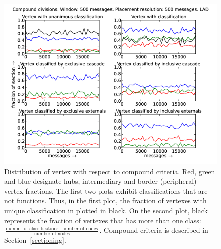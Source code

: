 \documentclass[%
 aip,
 jmp,%
 amsmath,amssymb,
 reprint,%
]{revtex4-1}
\begin{document}
\begin{figure}[hbtp] 
   \centering
        \includegraphics[width=\textwidth]{figs/LAD/500_2}
    \caption{Distribution of vertex with respect to compound criteria. Red, green and blue designate hubs, intermediary and border (peripheral) vertex fractions. The first two plots exhibit classifications that are not functions. Thus, in the first plot, the fraction of vertexes with unique classification in plotted in black. On the second plot, black represents the fraction of vertexes that has more than one class: $\frac{\text{number of classifications} - \text{number of nodes}}{\text{number of nodes}}$. Compound criteria is described in Section~\ref{sectioning}.}
    \label{fig:lad500_}
\end{figure}
\end{document}
